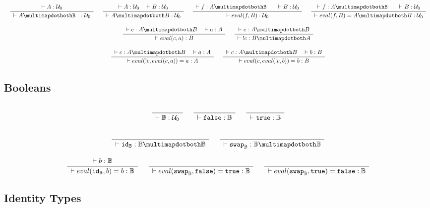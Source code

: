 \documentclass[format=acmlarge,review,natbib]{acmart}
\newcommand{\invc}[1]{!#1}
\newcommand{\evalone}[2]{eval(#1,#2)}
\newcommand{\idc}{\mathtt{id}}
\newcommand{\swapc}{\mathtt{swap}}
\newcommand{\iso}{\multimapdotboth}
\newcommand{\piso}{\multimapdotbothB~~}
\newcommand{\fc}{\mathtt{false}}
\newcommand{\tc}{\mathtt{true}}
\newcommand{\boolt}{\mathbb{B}}
\newcommand{\uzero}{\mathcal{U}_0}
\newcommand{\Rule}[2]{
\makebox{
$\displaystyle
\frac{\begin{array}{l}#1\\\end{array}}
{\begin{array}{l}#2\\\end{array}}$}}
\newcommand{\proves}{\vdash}
\newcommand{\jdg}[3]{#1 \proves #2 : #3}
\begin{document}
\[\begin{array}{c}
\Rule{\jdg{}{A}{\uzero}}
        {\jdg{}{A\piso}{\uzero}}
\quad
\Rule{\jdg{}{A}{\uzero}
         \quad \jdg{}{B}{\uzero}}
        {\jdg{}{A\iso B}{\uzero}}
\quad
\Rule{\jdg{}{f}{A \piso}
         \quad\jdg{}{B}{\uzero}}
        {\jdg{}{\evalone{f}{B}}{\uzero}}
\quad
\Rule{\jdg{}{f}{A \piso}
         \quad\jdg{}{B}{\uzero}}
        {\jdg{}{\evalone{f}{B} = A \iso B}{\uzero}}
\\
\\
\Rule{\jdg{}{c}{A \iso B}
         \quad\jdg{}{a}{A}}
        {\jdg{}{\evalone{c}{a}}{B}}
\quad
\Rule{\jdg{}{c}{A \iso B}}
        {\jdg{}{\;\invc{c}}{B \iso A}}
\\
\\
\Rule{\jdg{}{c}{A \iso B}
         \quad\jdg{}{a}{A}}
        {\jdg{}{\evalone{\invc{c}}{\evalone{c}{a}} = a}{A}}
\quad
\Rule{\jdg{}{c}{A \iso B}
         \quad\jdg{}{b}{B}}
        {\jdg{}{\evalone{c}{\evalone{\invc{c}}{b}} = b}{B}}
\end{array}\]

\subsection{Booleans}

\[\begin{array}{c}
\Rule{}{\jdg{}{\boolt}{\uzero}}
\quad
\Rule{}{\jdg{}{\fc}{\boolt}}
\quad
\Rule{}{\jdg{}{\tc}{\boolt}}
\\
\\
\Rule{}{\jdg{}{\idc_{\boolt}}{\boolt\iso\boolt}}
\quad
\Rule{}{\jdg{}{\swapc_{\boolt}}{\boolt\iso\boolt}}
\\
\\
\Rule{\jdg{}{b}{\boolt}}
        {\jdg{}{\evalone{\idc_{\boolt}}{b} = b}{\boolt}}
\quad
\Rule{}
        {\jdg{}{\evalone{\swapc_{\boolt}}{\fc} = \tc}{\boolt}}
\quad
\Rule{}
        {\jdg{}{\evalone{\swapc_{\boolt}}{\tc} = \fc}{\boolt}}
\end{array}\]

\subsection{Identity Types}
\end{document}
